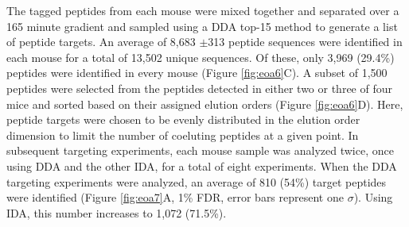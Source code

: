 The tagged peptides from each mouse were mixed together and separated over a 165 minute gradient and sampled using a DDA top-15 method to generate a list of peptide targets. An average of 8,683 $\pm$313 peptide sequences were identified in each mouse for a total of 13,502 unique sequences. Of these, only 3,969 (29.4\%) peptides were identified in every mouse (Figure \ref{fig:eoa6}C). A subset of 1,500 peptides were selected from the peptides detected in either two or three of four mice and sorted based on their assigned elution orders (Figure \ref{fig:eoa6}D). Here, peptide targets were chosen to be evenly distributed in the elution order dimension to limit the number of coeluting peptides at a given point. In subsequent targeting experiments, each mouse sample was analyzed twice, once using DDA and the other IDA, for a total of eight experiments. When the DDA targeting experiments were analyzed, an average of 810 (54\%) target peptides were identified (Figure \ref{fig:eoa7}A, 1\% FDR, error bars represent one $\sigma$). Using IDA, this number increases to 1,072 (71.5\%).

